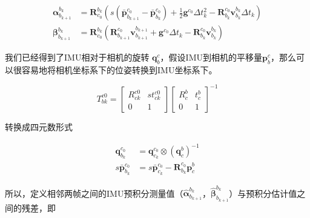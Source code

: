 \documentclass[12pt,a4paper]{article}
\begin{document}
\begin{equation}
\begin{aligned}
\boldsymbol{\alpha}^{b_{k}}_{b_{k+1}} 
&= 
\mathbf{R}^{b_{k}}_{c_{0}}
\left(
s(\bar{\mathbf{p}}^{c_{0}}_{b_{k+1}} - \bar{\mathbf{p}}^{c_{0}}_{b_{k}}) +
\frac{1}{2}\mathbf{g}^{c_{0}} \Delta t_{k}^{2} -
\mathbf{R}^{c_0}_{b_k} \mathbf{v}^{b_k}_{b_{k}} \Delta t_{k} 
\right) 
\\
\boldsymbol{\beta}^{b_{k}}_{b_{k+1}} &=
\mathbf{R}^{b_{k}}_{c_{0}}
\left(
\mathbf{R}^{c_0}_{b_{k+1}} \mathbf{v}^{b_{k+1}}_{b_{k+1}} +
\mathbf{g}^{c_{0}}\Delta t_{k} - \mathbf{R}^{c_0}_{b_k} \mathbf{v}^{b_k}_{b_{k}}
\right)
\end{aligned}
\end{equation}

我们已经得到了IMU相对于相机的旋转 $\mathbf{q}_{b}^{c}$，假设IMU到相机的平移量$\mathbf{p}_{b}^{c}$，那么可以很容易地将相机坐标系下的位姿转换到IMU坐标系下。

\begin{equation}
	T_{bk}^{c0} = 
	\begin{bmatrix}
		R_{ck}^{c0} & st_{ck}^{c0} \\
		0 & 1
	\end{bmatrix}
	\begin{bmatrix}
		R_{c}^{b} & t_{c}^{b} \\
		0 & 1
	\end{bmatrix}^{-1}
\end{equation}

转换成四元数形式

\begin{equation}
\begin{aligned}
\mathbf{q}_{b_{k}}^{c_{0}} &=
\mathbf{q}^{c_{0}}_{c_{k}} \otimes (\mathbf{q}_{c}^{b})^{-1}  \\
s \bar{\mathbf{p}}^{c_{0}}_{b_{k}} &=
s \bar{\mathbf{p}}^{c_{0}}_{c_{k}} - \mathbf{R}^{c_{0}}_{b_{k}} \mathbf{p}_{c}^{b}
\end{aligned}
\end{equation}

所以，定义相邻两帧之间的IMU预积分测量值（${\hat{\boldsymbol{\alpha}}}_{b_{k+1}}^{b_{k}}$，${\hat{\boldsymbol{\beta}}}_{b_{k+1}}^{b_{k}}$）与预积分估计值之间的残差，即
\end{document}
